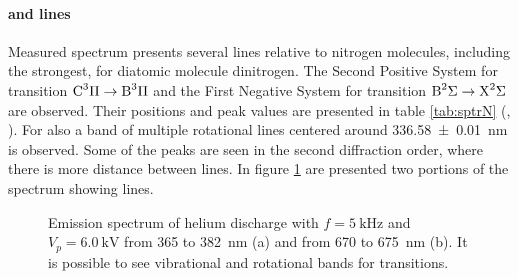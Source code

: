 \paragraph{ and  lines}
Measured spectrum presents several lines relative to nitrogen molecules, including the strongest, for diatomic molecule dinitrogen. The Second Positive System for  transition $\ce{C^3\Pi} \rightarrow \ce{B^3\Pi}$ and the First Negative System for  transition $\ce{B^2\Sigma} \rightarrow \ce{X^2\Sigma}$ are observed. Their positions and peak values are presented in table \ref{tab:sptrN} (\cite{N2lab}, \cite{Britun_2007}). For  also a band of multiple rotational lines centered around \SI{336.58(1)}{\nano\meter} is observed.
Some of the peaks are seen in the second diffraction order, where there is more distance between lines. In figure \ref{fig:N2} are presented two portions of the spectrum showing  lines.
\begin{figure}
 \centering
 \hfill
 \caption{Emission spectrum of helium discharge with $f = \SI{5}{\kilo\hertz}$ and $V_p = \SI{6.0}{\kilo\volt}$ from \num{365} to \SI{382}{\nano\meter} (a) and from \num{670} to \SI{675}{\nano\meter} (b). It is possible to see vibrational and rotational bands for  transitions.}
 \label{fig:N2}
\end{figure}

